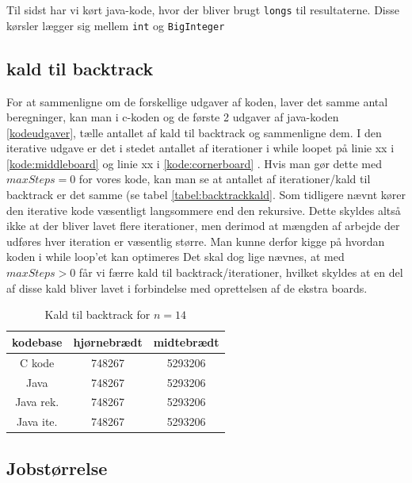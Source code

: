 Til sidst har vi kørt java-kode, hvor der bliver brugt \texttt{longs} til
resultaterne. Disse kørsler lægger sig mellem \texttt{int} og
\texttt{BigInteger}

\subsection{kald til backtrack}

For at sammenligne om de forskellige udgaver af koden, laver det samme antal
beregninger, kan man i c-koden og de første 2 udgaver af java-koden
\ref{kodeudgaver}, tælle antallet af kald til backtrack og sammenligne dem.  I
den iterative udgave er det i stedet antallet af iterationer i while loopet på
linie xx i \ref{kode:middleboard} og linie xx i \ref{kode:cornerboard}
. Hvis man gør dette med $maxSteps=0$ for vores kode,
kan man se at antallet af iterationer/kald til backtrack er det samme (se tabel
\ref{tabel:backtrackkald}. Som tidligere nævnt kører den iterative kode
væsentligt langsommere end den rekursive. Dette skyldes altså ikke at der bliver
lavet flere iterationer, men derimod at mængden af arbejde der udføres hver
iteration er væsentlig større. Man kunne derfor kigge på hvordan koden i while
loop'et kan optimeres Det skal dog lige nævnes, at med $maxSteps>0$ får vi færre
kald til backtrack/iterationer, hvilket skyldes at en del af disse kald bliver
lavet i forbindelse med oprettelsen af de ekstra boards. 

\begin{table}
\begin{center}
\begin{tabular}{|c|c|c|}
\hline kodebase  & hjørnebrædt & midtebrædt \\
\hline C kode    &  748267           &  5293206           \\
\hline Java      &  748267           &  5293206           \\
\hline Java rek. &  748267           &  5293206           \\
\hline Java ite. &  748267           &  5293206           \\
\hline
\end{tabular}
\caption{Kald til backtrack for $n=14$}
\label{table:backtrackkald}
\end{center}
\end{table}

\subsection{Jobstørrelse}

